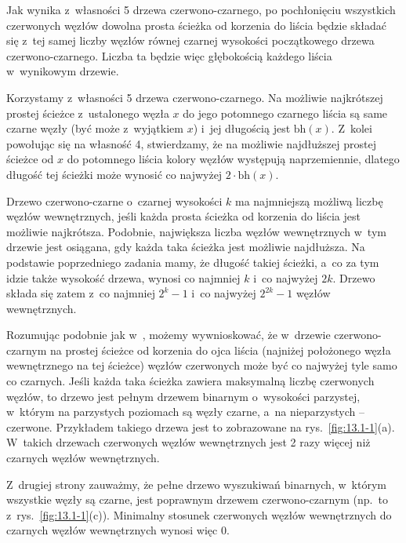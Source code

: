 Jak wynika z~własności 5 drzewa czerwono-czarnego, po pochłonięciu wszystkich czerwonych węzłów dowolna prosta ścieżka od korzenia do liścia będzie składać się z~tej samej liczby węzłów równej czarnej wysokości początkowego drzewa czerwono-czarnego.
Liczba ta będzie więc głębokością każdego liścia w~wynikowym drzewie.

\exercise %
Korzystamy z~własności 5 drzewa czerwono-czarnego.
Na możliwie najkrótszej prostej ścieżce z~ustalonego węzła $x$ do jego potomnego czarnego liścia są same czarne węzły (być może z~wyjątkiem $x$) i~jej długością jest $\mathrm{bh}(x)$.
Z~kolei powołując się na własność 4, stwierdzamy, że na możliwie najdłuższej prostej ścieżce od $x$ do potomnego liścia kolory węzłów występują naprzemiennie, dlatego długość tej ścieżki może wynosić co najwyżej $2\cdot\mathrm{bh}(x)$.

\exercise %
Drzewo czerwono-czarne o~czarnej wysokości $k$ ma najmniejszą możliwą liczbę węzłów wewnętrznych, jeśli każda prosta ścieżka od korzenia do liścia jest możliwie najkrótsza.
Podobnie, największa liczba węzłów wewnętrznych w~tym drzewie jest osiągana, gdy każda taka ścieżka jest możliwie najdłuższa.
Na podstawie poprzedniego zadania mamy, że długość takiej ścieżki, a~co za tym idzie także wysokość drzewa, wynosi co najmniej $k$ i~co najwyżej $2k$.
Drzewo składa się zatem z~co najmniej $2^k-1$ i~co najwyżej $2^{2k}-1$ węzłów wewnętrznych.

\exercise %
Rozumując podobnie jak w~, możemy wywnioskować, że w~drzewie czerwono-czarnym na prostej ścieżce od korzenia do ojca liścia (najniżej położonego węzła wewnętrznego na tej ścieżce) węzłów czerwonych może być co najwyżej tyle samo co czarnych.
Jeśli każda taka ścieżka zawiera maksymalną liczbę czerwonych węzłów, to drzewo jest pełnym drzewem binarnym o~wysokości parzystej, w~którym na parzystych poziomach są węzły czarne, a~na nieparzystych -- czerwone.
Przykładem takiego drzewa jest to zobrazowane na rys.\ \ref{fig:13.1-1}(a).
W~takich drzewach czerwonych węzłów wewnętrznych jest 2 razy więcej niż czarnych węzłów wewnętrznych.

Z~drugiej strony zauważmy, że pełne drzewo wyszukiwań binarnych, w~którym wszystkie węzły są czarne, jest poprawnym drzewem czerwono-czarnym (np.\ to z~rys.\ \ref{fig:13.1-1}(c)).
Minimalny stosunek czerwonych węzłów wewnętrznych do czarnych węzłów wewnętrznych wynosi więc 0.
